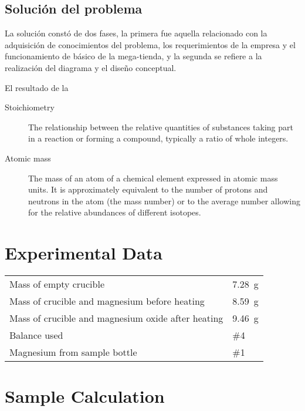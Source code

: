\documentclass{article}
\begin{document}
\subsection{Soluci\'on del problema}

La soluci\'on const\'o de dos fases, la primera fue aquella relacionado con la adquisici\'on de conocimientos del problema, los requerimientos de la empresa y el funcionamiento de b\'asico de la mega-tienda, y la segunda se refiere a la realizaci\'on del diagrama y el dise\~no conceptual.

El resultado de la  
\label{definitions}
\begin{description}
\item[Stoichiometry]
The relationship between the relative quantities of substances taking part in a reaction or forming a compound, typically a ratio of whole integers.
\item[Atomic mass]
The mass of an atom of a chemical element expressed in atomic mass units. It is approximately equivalent to the number of protons and neutrons in the atom (the mass number) or to the average number allowing for the relative abundances of different isotopes. 
\end{description} 
 

\section{Experimental Data}

\begin{tabular}{ll}
Mass of empty crucible & \SI{7.28}{\gram}\\
Mass of crucible and magnesium before heating & \SI{8.59}{\gram}\\
Mass of crucible and magnesium oxide after heating & \SI{9.46}{\gram}\\
Balance used & \#4\\
Magnesium from sample bottle & \#1
\end{tabular}


\section{Sample Calculation}
\end{document}
